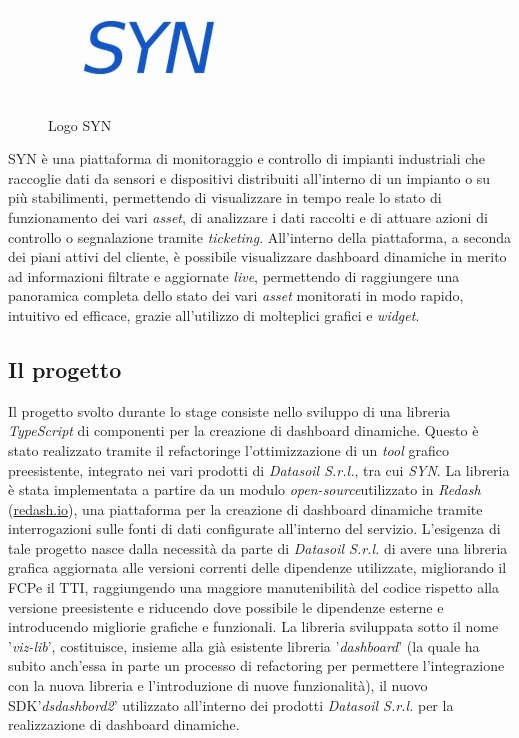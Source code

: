 \begin{figure}[H]
      \centering
      \includegraphics[alt={Logo SYN}, width=0.25\columnwidth]{img/syn_logo.jpg}
      \caption{Logo SYN}
      \label{fig:syn}
\end{figure}

SYN è una piattaforma di monitoraggio e controllo di impianti industriali che raccoglie dati da sensori e dispositivi
distribuiti all'interno di un impianto o su più stabilimenti, permettendo di visualizzare in tempo reale lo stato di
funzionamento dei vari \textit{asset}, di analizzare i dati raccolti e di attuare azioni di controllo o segnalazione tramite
\textit{ticketing}. All'interno della piattaforma, a seconda dei piani attivi del cliente, è possibile visualizzare dashboard dinamiche
in merito ad informazioni filtrate e aggiornate \textit{live}, permettendo di raggiungere una panoramica completa dello stato dei vari
\textit{asset} monitorati in modo rapido, intuitivo ed efficace, grazie all'utilizzo di molteplici grafici e \textit{widget}.

\subsection{Il progetto}
Il progetto svolto durante lo stage consiste nello sviluppo di una libreria \textit{TypeScript} di componenti per la creazione di dashboard dinamiche.
Questo è stato realizzato tramite il \gls{refactoring}\glox e l'ottimizzazione di un \textit{tool} grafico preesistente, integrato nei vari prodotti di \textit{Datasoil S.r.l.},
tra cui \textit{SYN}. La libreria è stata implementata a partire da un modulo \textit{\gls{open-source}}\glox utilizzato in \textit{Redash} (\href{https://redash.io}{redash.io}),
una piattaforma per la creazione di dashboard dinamiche tramite interrogazioni sulle fonti di dati configurate all'interno del servizio. \newline
L'esigenza di tale progetto nasce dalla necessità da parte di \textit{Datasoil S.r.l.} di avere una libreria grafica aggiornata alle versioni
correnti delle dipendenze utilizzate, migliorando il \gls{FCP}\glox e il \gls{TTI}\glox, raggiungendo una maggiore manutenibilità del codice rispetto alla versione
preesistente e riducendo dove possibile le dipendenze esterne e introducendo migliorie grafiche e funzionali. \newline
La libreria sviluppata sotto il nome '\textit{viz-lib}', costituisce, insieme alla già esistente libreria '\textit{dashboard}' (la quale ha subito anch'essa in parte un processo di refactoring
per permettere l'integrazione con la nuova libreria e l'introduzione di nuove funzionalità), il nuovo \gls{SDK}\glox '\textit{dsdashbord2}'
utilizzato all'interno dei prodotti \textit{Datasoil S.r.l.} per la realizzazione di dashboard dinamiche.

